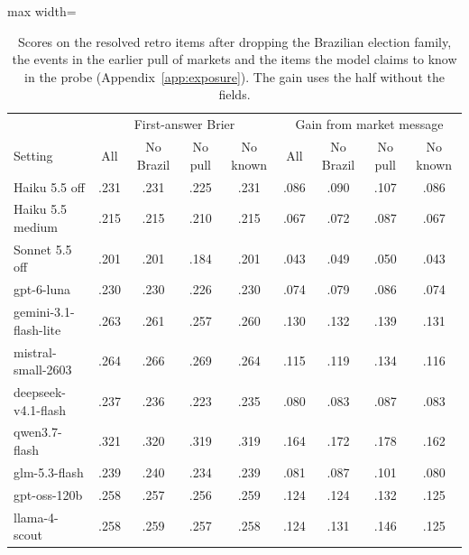 \begin{table}[t]
\centering
\footnotesize
\setlength{\tabcolsep}{3pt}
\begin{adjustbox}{max width=\linewidth}
\begin{tabular}{lcccccccc}
\toprule
& \multicolumn{4}{c}{First-answer Brier} & \multicolumn{4}{c}{Gain from market message} \\
Setting & All & No Brazil & No pull & No known & All & No Brazil & No pull & No known \\
\midrule
Haiku 5.5 off & .231 & .231 & .225 & .231 & .086 & .090 & .107 & .086 \\
Haiku 5.5 medium & .215 & .215 & .210 & .215 & .067 & .072 & .087 & .067 \\
Sonnet 5.5 off & .201 & .201 & .184 & .201 & .043 & .049 & .050 & .043 \\
gpt-6-luna & .230 & .230 & .226 & .230 & .074 & .079 & .086 & .074 \\
gemini-3.1-flash-lite & .263 & .261 & .257 & .260 & .130 & .132 & .139 & .131 \\
mistral-small-2603 & .264 & .266 & .269 & .264 & .115 & .119 & .134 & .116 \\
deepseek-v4.1-flash & .237 & .236 & .223 & .235 & .080 & .083 & .087 & .083 \\
qwen3.7-flash & .321 & .320 & .319 & .319 & .164 & .172 & .178 & .162 \\
glm-5.3-flash & .239 & .240 & .234 & .239 & .081 & .087 & .101 & .080 \\
gpt-oss-120b & .258 & .257 & .256 & .259 & .124 & .124 & .132 & .125 \\
llama-4-scout & .258 & .259 & .257 & .258 & .124 & .131 & .146 & .125 \\
\bottomrule
\end{tabular}
\end{adjustbox}
\caption{Scores on the resolved retro items after dropping the Brazilian election family, the events in the earlier pull of markets and the items the model claims to know in the probe (Appendix~\ref{app:exposure}). The gain uses the half without the fields.}
\label{tab:scorerobust}
\end{table}
